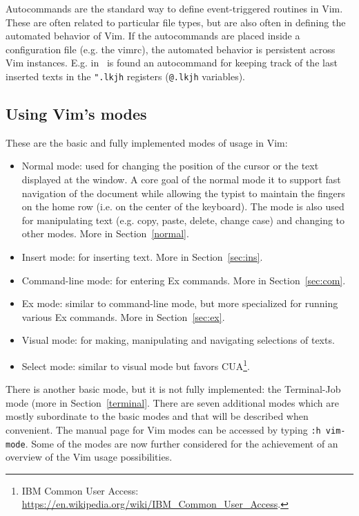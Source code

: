 \documentclass{article}
\newcommand{\tttt}[1]{\texttt{#1}}
\begin{document}
Autocommands are the standard way to define event-triggered routines in Vim.
These are often related to particular file types, but are also often
in defining the automated behavior of Vim.
If the autocommands are placed inside a configuration file (e.g. the
vimrc), the automated behavior is persistent across Vim instances.
E.g. in~\cite{vimrc} is found an autocommand for keeping track of the last inserted texts in the \tttt{".lkjh} registers (\tttt{@.lkjh} variables).

\subsection{Using Vim's modes}\label{modes}
These are the  basic and fully implemented modes of usage in Vim:
\begin{itemize}
  \item Normal mode: used for changing
  the position of the cursor or the text displayed
  at the window.
  A core goal of the normal mode it to support fast
  navigation of the document while allowing
  the typist to maintain the fingers on the home row
  (i.e. on the center of the keyboard).
  The mode is also used for manipulating text
  (e.g. copy, paste, delete, change case) and
    changing to other modes.
    More in Section~\ref{normal}.
  \item Insert mode: for inserting text. More in
    Section~\ref{sec:ins}.
  \item Command-line mode: for entering Ex commands. More in
    Section~\ref{sec:com}.
  \item Ex mode: similar to command-line mode,
  but more specialized for running various Ex commands.
    More in Section~\ref{sec:ex}.
  \item Visual mode: for making, manipulating and navigating
  selections of texts.
  \item Select mode: similar to visual mode but
  favors CUA\footnote{IBM Common User Access:
    \url{https://en.wikipedia.org/wiki/IBM_Common_User_Access}.}.
\end{itemize}

There is another basic mode, but it is not fully implemented:
the Terminal-Job mode (more in Section~\ref{terminal}.
There are seven additional modes which are mostly subordinate 
to the basic modes and that will be described when convenient.
The manual page for Vim modes can be accessed by typing
\texttt{:h vim-mode}.
Some of the modes are now further considered for
the achievement of
an overview of the Vim usage possibilities.
\end{document}
